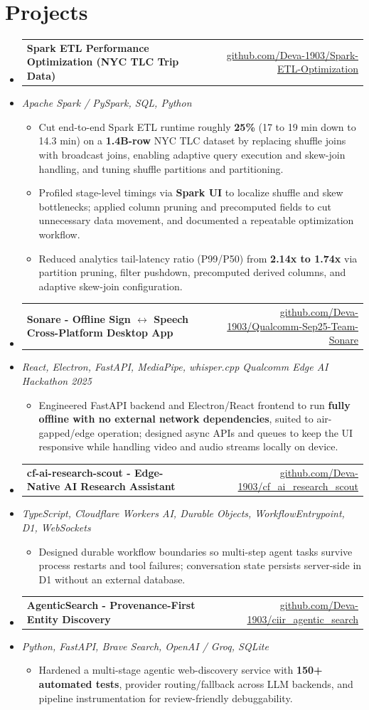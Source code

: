 \documentclass[letterpaper,10pt]{article}
\makeatletter
\newcommand{\resumeItem}[1]{
  \item\small{#1\vspace{-1pt}}
}
\newcommand{\resumeProjectHeading}[2]{
    \item
    \begin{tabular*}{0.985\textwidth}[t]{l@{\extracolsep{\fill}}r}
      \small\textbf{#1} & \small #2 \\
    \end{tabular*}\vspace{-5pt}
}
\newcommand{\resumeProjectSubheading}[1]{
  \vspace{-2pt}\item[] {\small\textcolor{ResumeSlate}{\emph{#1}}}\vspace{-3pt}
}
\newcommand{\resumeSubHeadingListStart}{\begin{itemize}[leftmargin=0.0in, label={}, itemsep=2pt, topsep=2pt]}
\newcommand{\resumeSubHeadingListEnd}{\end{itemize}}
\newcommand{\resumeItemListStart}{\begin{itemize}[leftmargin=0.18in, itemsep=2pt, topsep=1pt]}
\newcommand{\resumeItemListEnd}{\end{itemize}\vspace{-4pt}}
\makeatother
\begin{document}
\section{Projects}
\resumeSubHeadingListStart
  \resumeProjectHeading
    {Spark ETL Performance Optimization (NYC TLC Trip Data)}
    {\href{https://github.com/Deva-1903/Spark-ETL-Optimization}{github.com/Deva-1903/Spark-ETL-Optimization}}
  \resumeProjectSubheading{Apache Spark / PySpark, SQL, Python}
    \resumeItemListStart
      \resumeItem{Cut end-to-end Spark ETL runtime roughly \textbf{25\%} (17 to 19 min down to 14.3 min) on a \textbf{1.4B-row} NYC TLC dataset by replacing shuffle joins with broadcast joins, enabling adaptive query execution and skew-join handling, and tuning shuffle partitions and partitioning.}
      \resumeItem{Profiled stage-level timings via \textbf{Spark UI} to localize shuffle and skew bottlenecks; applied column pruning and precomputed fields to cut unnecessary data movement, and documented a repeatable optimization workflow.}
      \resumeItem{Reduced analytics tail-latency ratio (P99/P50) from \textbf{2.14x to 1.74x} via partition pruning, filter pushdown, precomputed derived columns, and adaptive skew-join configuration.}
    \resumeItemListEnd
  \resumeProjectHeading
    {Sonare - Offline Sign \(\leftrightarrow\) Speech Cross-Platform Desktop App}
    {\href{https://github.com/Deva-1903/Qualcomm-Sep25-Team-Sonare}{github.com/Deva-1903/Qualcomm-Sep25-Team-Sonare}}
  \resumeProjectSubheading{React, Electron, FastAPI, MediaPipe, whisper.cpp \enspace\textbar\enspace Qualcomm Edge AI Hackathon 2025}
    \resumeItemListStart
      \resumeItem{Engineered FastAPI backend and Electron/React frontend to run \textbf{fully offline with no external network dependencies}, suited to air-gapped/edge operation; designed async APIs and queues to keep the UI responsive while handling video and audio streams locally on device.}
    \resumeItemListEnd
  \resumeProjectHeading
    {cf-ai-research-scout - Edge-Native AI Research Assistant}
    {\href{https://github.com/Deva-1903/cf_ai_research_scout}{github.com/Deva-1903/cf\_ai\_research\_scout}}
  \resumeProjectSubheading{TypeScript, Cloudflare Workers AI, Durable Objects, WorkflowEntrypoint, D1, WebSockets}
    \resumeItemListStart
      \resumeItem{Designed durable workflow boundaries so multi-step agent tasks survive process restarts and tool failures; conversation state persists server-side in D1 without an external database.}
    \resumeItemListEnd
  \resumeProjectHeading
    {AgenticSearch - Provenance-First Entity Discovery}
    {\href{https://github.com/Deva-1903/ciir_agentic_search}{github.com/Deva-1903/ciir\_agentic\_search}}
  \resumeProjectSubheading{Python, FastAPI, Brave Search, OpenAI / Groq, SQLite}
    \resumeItemListStart
      \resumeItem{Hardened a multi-stage agentic web-discovery service with \textbf{150+ automated tests}, provider routing/fallback across LLM backends, and pipeline instrumentation for review-friendly debuggability.}
    \resumeItemListEnd
\resumeSubHeadingListEnd
\vspace{-4pt}
\end{document}
